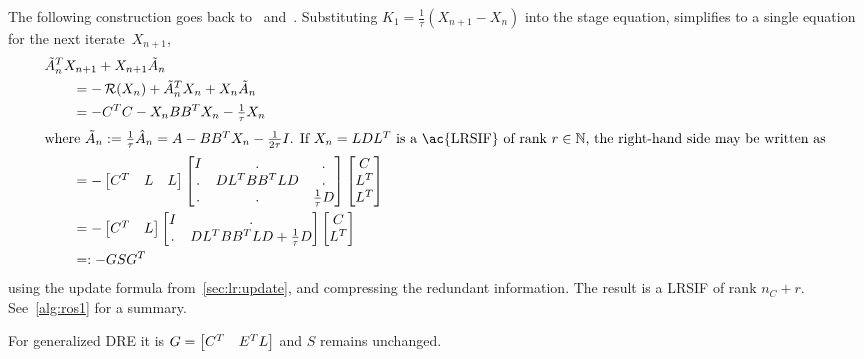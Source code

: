 The following construction goes back to~\cite[Section~4.3.3]{Mena2007} and~\cite[Section~6.2.2]{Lang2017}.
Substituting $K_1 = \frac{1}{\tau}(X_{n+1} - X_n)$ into the stage equation,
 simplifies to a single \Lyapunov equation for the next iterate~$X_{n+1}$,
\begin{subequations}
\begin{align}
  \MoveEqLeft
  \tilde A_n^\T X_{n+1} + X_{n+1} \tilde A_n
  \nonumber \\
  &= -\Ricc(X_n) +
  \tilde A_n^\T X_n + X_n \tilde A_n \\
  &= -C^\T C - X_n BB^\T X_n - \tfrac{1}{\tau} X_n \\
\intertext{%
where $\tilde A_n := \frac{1}{\tau} \hat A_n = A - BB^\T X_n - \frac{1}{2\tau} I$.
If $X_n = LDL^\T$ is a \ac{LRSIF} of rank $r\in\N$,
the right-hand side may be written as
}
  &= -\begin{bmatrix}
    C^\T & L & L
  \end{bmatrix}
  \begin{bmatrix}
    I & . & . \\
    . & DL^\T BB^\T LD & . \\
    . & . & \tfrac{1}{\tau} D
  \end{bmatrix}
  \begin{bmatrix}
    C \\ L^\T \\ L^\T
  \end{bmatrix} \\
  \label{eq:ros:lr-condensed:1}
  &= -\begin{bmatrix}
    C^\T & L
  \end{bmatrix}
  \begin{bmatrix}
    I & . \\
    . & DL^\T BB^\T LD + \tfrac{1}{\tau} D
  \end{bmatrix}
  \begin{bmatrix}
    C \\ L^\T
  \end{bmatrix} \\
  &=: -GSG^\T
\end{align}
\end{subequations}
using the update formula from~\autoref{sec:lr:update},
and compressing the redundant information.
The result is a \ac{LRSIF} of rank $n_C + r$.
See~\autoref{alg:ros1} for a summary.

\begin{remark}
  For generalized \ac{DRE} it is $G = \begin{bmatrix}
    C^T & E^T L
  \end{bmatrix}$ and $S$ remains unchanged.
\end{remark}

